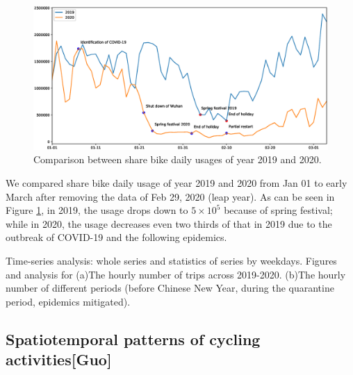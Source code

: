 \documentclass[preprints,ijgi,submit,moreauthors]{Definitions/mdpi}
\begin{document}
\begin{figure}[H]
    \centering
    \includegraphics[width=\textwidth]{Compare_temporal.eps}
    \caption{Comparison between share bike daily usages of year 2019 and 2020.}
    \label{fig:temporal_comparison}
\end{figure}

We compared share bike daily usage of year 2019 and 2020 from Jan 01 to early March after removing the data of Feb 29, 2020 (leap year).
As can be seen in Figure \ref{fig:temporal_comparison}, in 2019, the usage drops down to $5\times 10^5$ because of spring festival; 
while in 2020, the usage decreases even two thirds of that in 2019 due to the outbreak of COVID-19 and the following epidemics.

Time-series analysis: whole series and statistics of series by weekdays.
Figures and analysis for (a)The hourly number of trips across 2019-2020.
(b)The hourly number of different periods (before Chinese New Year, during the quarantine period, epidemics mitigated). 

\subsection{Spatiotemporal patterns of cycling activities\textbf{[Guo]}}
\end{document}
